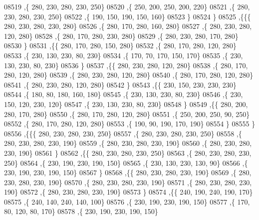 \begin{DoxyCode}
08519     ,\{   280,   230,   280,   230,   250\}
08520     ,\{   250,   200,   250,   200,   220\}
08521     ,\{   280,   230,   280,   230,   250\}
08522     ,\{   190,   150,   190,   150,   160\}
08523     \}
08524    \}
08525   ,\{\{\{   280,   230,   280,   230,   280\}
08526     ,\{   280,   170,   280,   160,   280\}
08527     ,\{   280,   230,   280,   120,   280\}
08528     ,\{   280,   170,   280,   230,   280\}
08529     ,\{   280,   230,   280,   170,   280\}
08530     \}
08531    ,\{\{   280,   170,   280,   150,   280\}
08532     ,\{   280,   170,   280,   120,   280\}
08533     ,\{   230,   130,   230,    80,   230\}
08534     ,\{   170,    70,   170,   150,   170\}
08535     ,\{   230,   130,   230,    80,   230\}
08536     \}
08537    ,\{\{   280,   230,   280,   120,   280\}
08538     ,\{   280,   170,   280,   120,   280\}
08539     ,\{   280,   230,   280,   120,   280\}
08540     ,\{   280,   170,   280,   120,   280\}
08541     ,\{   280,   230,   280,   120,   280\}
08542     \}
08543    ,\{\{   230,   150,   230,   230,   230\}
08544     ,\{   180,    80,   180,   160,   180\}
08545     ,\{   230,   130,   230,    80,   230\}
08546     ,\{   230,   150,   120,   230,   120\}
08547     ,\{   230,   130,   230,    80,   230\}
08548     \}
08549    ,\{\{   280,   200,   280,   170,   280\}
08550     ,\{   280,   170,   280,   120,   280\}
08551     ,\{   250,   200,   250,    90,   250\}
08552     ,\{   280,   170,   280,   120,   280\}
08553     ,\{   190,    90,   190,   170,   190\}
08554     \}
08555    \}
08556   ,\{\{\{   280,   230,   280,   230,   250\}
08557     ,\{   280,   230,   280,   230,   250\}
08558     ,\{   280,   230,   280,   230,   190\}
08559     ,\{   280,   230,   280,   230,   190\}
08560     ,\{   280,   230,   280,   230,   190\}
08561     \}
08562    ,\{\{   280,   230,   280,   230,   250\}
08563     ,\{   280,   230,   280,   230,   250\}
08564     ,\{   230,   190,   230,   190,   150\}
08565     ,\{   230,   130,   230,   130,    90\}
08566     ,\{   230,   190,   230,   190,   150\}
08567     \}
08568    ,\{\{   280,   230,   280,   230,   190\}
08569     ,\{   280,   230,   280,   230,   190\}
08570     ,\{   280,   230,   280,   230,   190\}
08571     ,\{   280,   230,   280,   230,   190\}
08572     ,\{   280,   230,   280,   230,   190\}
08573     \}
08574    ,\{\{   240,   190,   240,   190,   170\}
08575     ,\{   240,   140,   240,   140,   100\}
08576     ,\{   230,   190,   230,   190,   150\}
08577     ,\{   170,    80,   120,    80,   170\}
08578     ,\{   230,   190,   230,   190,   150\}

\end{DoxyCode}
